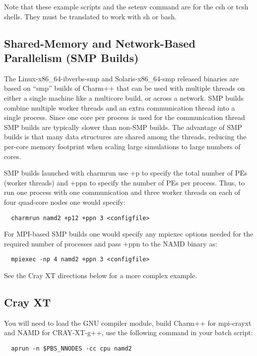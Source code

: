 Note that these example scripts and the setenv command are for the csh
or tcsh shells.  They must be translated to work with sh or bash.

\subsection{Shared-Memory and Network-Based Parallelism (SMP Builds)}

The Linux-x86\_64-ibverbs-smp and Solaris-x86\_64-smp released binaries are
based on ``smp'' builds of Charm++ that can be used with multiple threads
on either a single machine like a multicore build, or across a network.
SMP builds combine multiple worker threads and an extra communication
thread into a single process.  Since one core per process is used for
the communication thread SMP builds are typically slower than non-SMP
builds.  The advantage of SMP builds is that many data structures are
shared among the threads, reducing the per-core memory footprint when
scaling large simulations to large numbers of cores.

SMP builds launched with charmrun use +p to specify the total number of
PEs (worker threads) and +ppn to specify the number of PEs per process.
Thus, to run one process with one communication and three worker threads
on each of four quad-core nodes one would specify:

\begin{verbatim}
  charmrun namd2 +p12 +ppn 3 <configfile>
\end{verbatim}

For MPI-based SMP builds one would specify any mpiexec options needed
for the required number of processes and pass +ppn to the NAMD binary as:

\begin{verbatim}
  mpiexec -np 4 namd2 +ppn 3 <configfile>
\end{verbatim}

See the Cray XT directions below for a more complex example.

\subsection{Cray XT}

You will need to load the GNU compiler module, build Charm++ for mpi-crayxt
and NAMD for CRAY-XT-g++, use the following command in your batch script:

\begin{verbatim}
  aprun -n $PBS_NNODES -cc cpu namd2
\end{verbatim}


